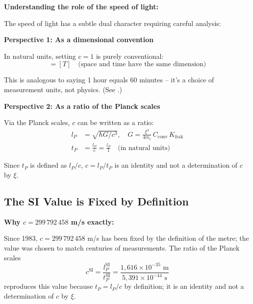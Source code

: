 	\begin{derivation}
		\textbf{Understanding the role of the speed of light:}
		
		The speed of light has a subtle dual character requiring careful analysis:
		
		\textbf{Perspective 1: As a dimensional convention}
		
		In natural units, setting $c = 1$ is purely conventional:
		\begin{equation}
			[L] = [T] \quad \text{(space and time have the same dimension)}
		\end{equation}
		
		This is analogous to saying 1 hour equals 60 minutes -- it's a choice of measurement units, not physics. (See \cite{unit_conventions_c_speed_En}.)
		
		\textbf{Perspective 2: As a ratio of the Planck scales}
		
		Via the Planck scales, $c$ can be written as a ratio:
		\begin{align}
			l_P &= \sqrt{\hbar G/c^3}, \quad G = \frac{\xi^2}{4m_e}\,C_{\text{conv}}\,K_{\text{frak}} \\
			t_P &= \frac{l_P}{c} = \frac{l_P}{1} \quad \text{(in natural units)}
		\end{align}
		
		Since $t_P$ is defined as $l_P/c$, $c = l_P/t_P$ is an identity and not a determination of $c$ by $\xi$.
	\end{derivation}
	
	\subsection{The SI Value is Fixed by Definition}
	
	\begin{keyresult}
		\textbf{Why $c = 299\,792\,458$ m/s exactly:}
		
		Since 1983, $c = 299\,792\,458$ m/s has been fixed by the definition of the metre; the value was chosen to match centuries of measurements. The ratio of the Planck scales
		\begin{equation}
			c^{\text{SI}} = \frac{l_P^{\text{SI}}}{t_P^{\text{SI}}} = \frac{1{,}616 \times 10^{-35} \text{ m}}{5{,}391 \times 10^{-44} \text{ s}}
		\end{equation}
		reproduces this value because $t_P = l_P/c$ by definition; it is an identity and not a determination of $c$ by $\xi$.
	\end{keyresult}
	
